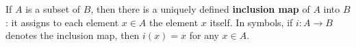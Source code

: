 If $A$ is a subset of $B$, then there is a uniquely defined \textbf{inclusion map} of $A$ into $B$: it assigns to each element $x \in A$ the element $x$ itself. In symbols, if $i \colon A \to B$ denotes the inclusion map, then $i(x) = x$ for any $x \in A$.
